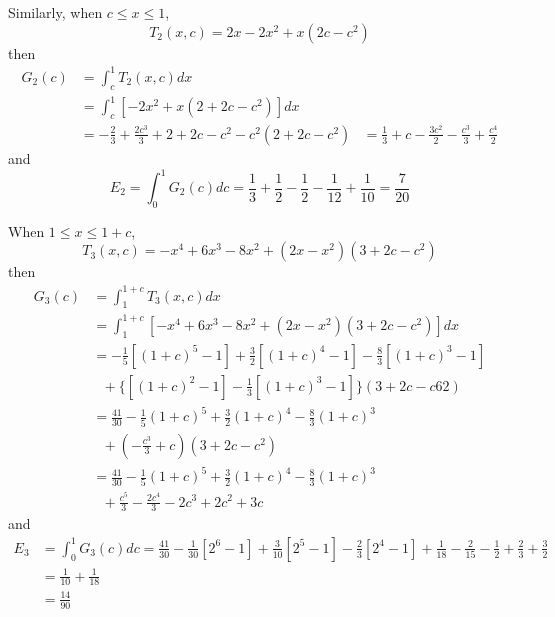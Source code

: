 \documentclass[12pt]{simple_doc}
\begin{document}
    Similarly, when $c \leqslant x \leqslant 1$,
    \begin{equation*}
        T_2(x, c) = 2x - 2x^2 + x(2c - c^2)
    \end{equation*}
    then
    \begin{equation*}
		\begin{aligned}
		G_2(c) &= \int_c^1 T_2(x, c) dx \\
		   &= \int_c^1 [- 2x^2 + x(2 + 2c - c^2)] dx\\
           &= -\frac{2}{3} + \frac{2c^3}{3} + 2 + 2c -c^2 -c^2(2 + 2c - c^2)
           &= \frac{1}{3} + c - \frac{3c^2}{2} - \frac{c^3}{3} + \frac{c^4}{2}
		\end{aligned}
    \end{equation*}
    and
    \begin{equation*}
        E_2 = \int_0^1 G_2(c)dc = \frac{1}{3} + \frac{1}{2}  - \frac{1}{2}
            - \frac{1}{12} + \frac{1}{10} = \frac{7}{20}
    \end{equation*}

    When $1 \leqslant x \leqslant 1 + c$,
    \begin{equation*}
        T_3(x, c) = -x^4 +6x^3 -8x^2 + (2x - x^2)(3 + 2c - c^2)
    \end{equation*}
    then
    \begin{equation*}
		\begin{aligned}
		G_3(c) &= \int_1^{1+c} T_3(x, c) dx \\
		   &= \int_1^{1+c} [-x^4 +6x^3 -8x^2 + (2x - x^2)(3 + 2c - c^2)] dx\\
           &= -\frac{1}{5}[(1+c)^5 - 1] + \frac{3}{2}[(1+c)^4 - 1] - \frac{8}{3}[(1+c)^3 - 1]\\
           &\ \ \ + \{[(1+c)^2 - 1] - \frac{1}{3}[(1+c)^3 - 1]\}(3 + 2c - c62)\\
           &= \frac{41}{30} - \frac{1}{5}(1+c)^5 + \frac{3}{2}(1+c)^4 - \frac{8}{3}(1+c)^3\\
           &\ \ \ + (-\frac{c^3}{3} + c)(3 + 2c - c^2)\\
           &= \frac{41}{30} - \frac{1}{5}(1+c)^5 + \frac{3}{2}(1+c)^4 - \frac{8}{3}(1+c)^3\\
           &\ \ \ + \frac{c^5}{3} - \frac{2c^4}{3} -2c^3 + 2c^2 + 3c
		\end{aligned}
    \end{equation*}
    and
    \begin{equation*}
        \begin{aligned}
        E_3 &= \int_0^1 G_3(c)dc = \frac{41}{30} - \frac{1}{30}[2^6 - 1] + \frac{3}{10}[2^5 - 1]
                - \frac{2}{3}[2^4 - 1] + \frac{1}{18} - \frac{2}{15} - \frac{1}{2}
                + \frac{2}{3} + \frac{3}{2}\\
            &= \frac{1}{10} + \frac{1}{18}\\
            &= \frac{14}{90}
        \end{aligned}
    \end{equation*}
\end{document}
